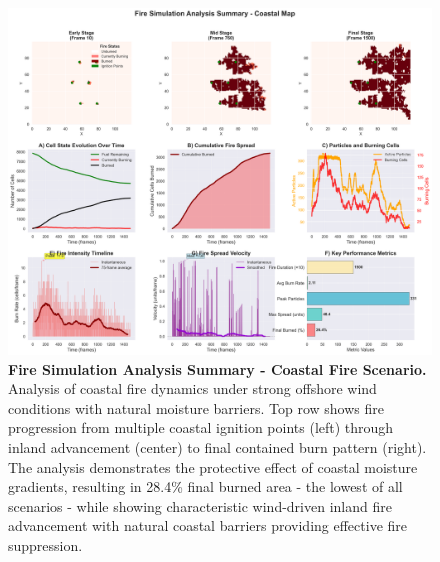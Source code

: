 \begin{figure}[H]
	\centering
	\includegraphics[width=\textwidth]{media/report_summary_coast.png}
	\caption{
		\textbf{Fire Simulation Analysis Summary - Coastal Fire Scenario.} 
		Analysis of coastal fire dynamics under strong offshore wind conditions with natural moisture barriers. Top row shows fire progression from multiple coastal ignition points (left) through inland advancement (center) to final contained burn pattern (right). The analysis demonstrates the protective effect of coastal moisture gradients, resulting in 28.4\% final burned area - the lowest of all scenarios - while showing characteristic wind-driven inland fire advancement with natural coastal barriers providing effective fire suppression.
	}
	\label{fig:res_coast}
\end{figure}
